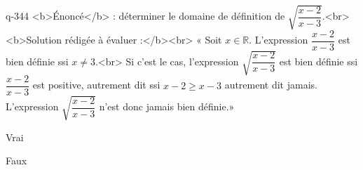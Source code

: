 \begin{truefalse}{q-344}
<b>Énoncé</b> : déterminer le domaine de définition de $\sqrt{\dfrac{x-2}{x-3}}$.<br> <b>Solution rédigée à évaluer :</b><br>  « Soit $x\in\mathbb{R}$. L'expression $\dfrac{x-2}{x-3}$ est bien définie ssi $x\neq 3$.<br> Si c'est le cas, l'expression $\sqrt{\dfrac{x-2}{x-3}}$ est bien définie ssi $\dfrac{x-2}{x-3}$ est positive, autrement dit ssi $x-2\geq x-3$ autrement dit jamais. L'expression $\sqrt{\dfrac{x-2}{x-3}}$ n'est donc jamais bien définie.»
\item Vrai
\item* Faux
\end{truefalse}

